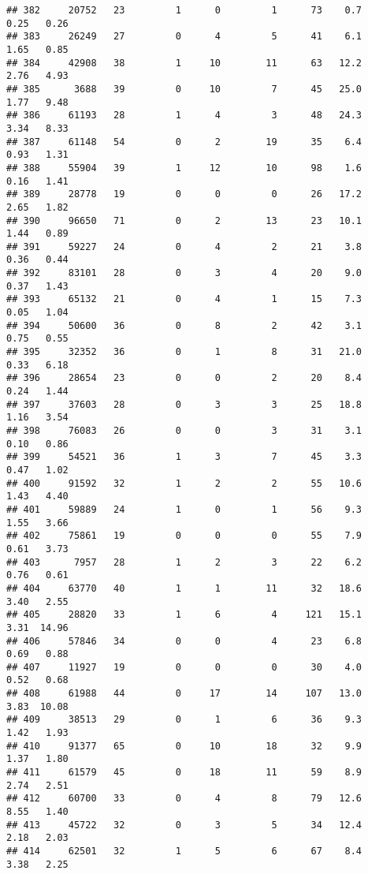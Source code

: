 \documentclass[
]{article}
\begin{document}
\begin{verbatim}
## 382     20752   23         1      0         1      73    0.7    0.25   0.26
## 383     26249   27         0      4         5      41    6.1    1.65   0.85
## 384     42908   38         1     10        11      63   12.2    2.76   4.93
## 385      3688   39         0     10         7      45   25.0    1.77   9.48
## 386     61193   28         1      4         3      48   24.3    3.34   8.33
## 387     61148   54         0      2        19      35    6.4    0.93   1.31
## 388     55904   39         1     12        10      98    1.6    0.16   1.41
## 389     28778   19         0      0         0      26   17.2    2.65   1.82
## 390     96650   71         0      2        13      23   10.1    1.44   0.89
## 391     59227   24         0      4         2      21    3.8    0.36   0.44
## 392     83101   28         0      3         4      20    9.0    0.37   1.43
## 393     65132   21         0      4         1      15    7.3    0.05   1.04
## 394     50600   36         0      8         2      42    3.1    0.75   0.55
## 395     32352   36         0      1         8      31   21.0    0.33   6.18
## 396     28654   23         0      0         2      20    8.4    0.24   1.44
## 397     37603   28         0      3         3      25   18.8    1.16   3.54
## 398     76083   26         0      0         3      31    3.1    0.10   0.86
## 399     54521   36         1      3         7      45    3.3    0.47   1.02
## 400     91592   32         1      2         2      55   10.6    1.43   4.40
## 401     59889   24         1      0         1      56    9.3    1.55   3.66
## 402     75861   19         0      0         0      55    7.9    0.61   3.73
## 403      7957   28         1      2         3      22    6.2    0.76   0.61
## 404     63770   40         1      1        11      32   18.6    3.40   2.55
## 405     28820   33         1      6         4     121   15.1    3.31  14.96
## 406     57846   34         0      0         4      23    6.8    0.69   0.88
## 407     11927   19         0      0         0      30    4.0    0.52   0.68
## 408     61988   44         0     17        14     107   13.0    3.83  10.08
## 409     38513   29         0      1         6      36    9.3    1.42   1.93
## 410     91377   65         0     10        18      32    9.9    1.37   1.80
## 411     61579   45         0     18        11      59    8.9    2.74   2.51
## 412     60700   33         0      4         8      79   12.6    8.55   1.40
## 413     45722   32         0      3         5      34   12.4    2.18   2.03
## 414     62501   32         1      5         6      67    8.4    3.38   2.25

\end{verbatim}
\end{document}
